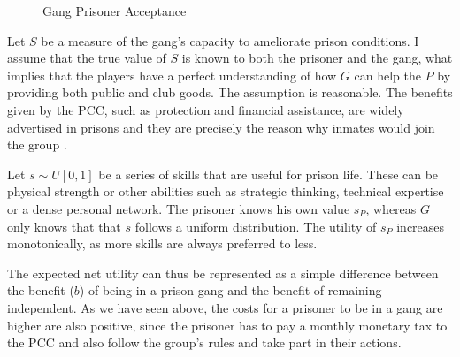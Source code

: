 \begin{figure}[htp]
\centering
{}
\caption{Gang Prisoner Acceptance}
\end{figure}

Let $S$ be a measure of the gang's capacity to ameliorate prison conditions. I assume that the true value of $S$ is known to both the prisoner and the gang, what implies that the players have a perfect understanding of how $G$ can help the $P$ by providing both public and club goods. The assumption is reasonable. The benefits given by the PCC, such as protection and financial assistance, are widely advertised in prisons and they are precisely the reason why inmates would join the group \citep{folha2012pendrive}.

Let $s \sim U \left[0,1\right]$ be a series of skills that are useful for prison life. These can be physical strength or other abilities such as strategic thinking, technical expertise or a dense personal network. The prisoner knows his own value $s_P$, whereas $G$ only knows that that $s$ follows a uniform distribution. The utility of $s_P$ increases monotonically, as more skills are always preferred to less. 

The expected net utility can thus be represented as a simple difference between the benefit ($b$) of being in a prison gang and the benefit of remaining independent. As we have seen above, the costs for a prisoner to be in a gang are higher are also positive, since the prisoner has to pay a monthly monetary tax to the PCC and also follow the group's rules and take part in their actions. 

